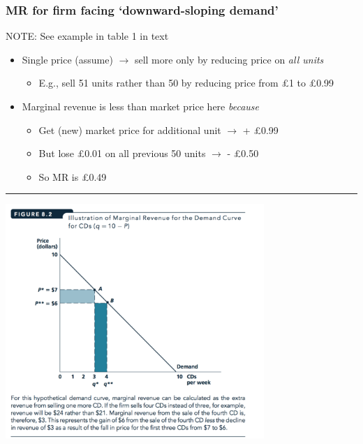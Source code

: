 \documentclass[]{article}
\providecommand{\tightlist}{%
  \setlength{\itemsep}{0pt}\setlength{\parskip}{0pt}}
\begin{document}
\hypertarget{mr-for-firm-facing-downward-sloping-demand}{%
\subsubsection{MR for firm facing `downward-sloping
demand'}\label{mr-for-firm-facing-downward-sloping-demand}}

NOTE: See example in table 1 in text

\begin{itemize}
\tightlist
\item
  Single price (assume) \(\rightarrow\) sell more only by reducing price
  on \emph{all units}

  \begin{itemize}
  \tightlist
  \item
    E.g., sell 51 units rather than 50 by reducing price from £1 to
    £0.99
  \end{itemize}
\item
  Marginal revenue is less than market price here \emph{because}

  \begin{itemize}
  \tightlist
  \item
    Get (new) market price for additional unit \(\rightarrow\) + £0.99
  \item
    But lose £0.01 on all previous 50 units \(\rightarrow\) - £0.50
  \item
    So MR is £0.49
  \end{itemize}
\end{itemize}

\begin{center}\rule{0.5\linewidth}{\linethickness}\end{center}

\includegraphics[height=3.5in]{picsfigs/Mrillustrated.png}
\end{document}

